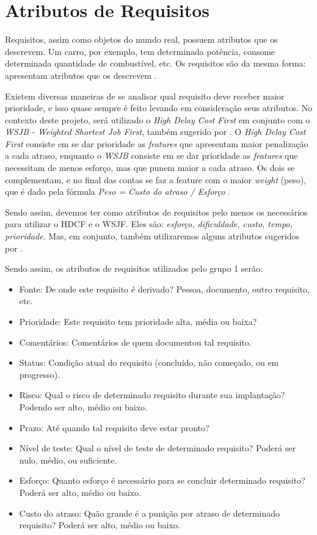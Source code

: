 \section{Atributos de Requisitos}
Requisitos, assim como objetos do mundo real, possuem atributos que os descrevem. Um carro, por exemplo, tem determinada potência, consome determinada quantidade de combustível, etc. Os requisitos são da mesma forma: apresentam atributos que os descrevem \cite{tel006}.

Existem diversas maneiras de se analisar qual requisito deve receber maior prioridade, e isso quase sempre é feito levando em consideração seus atributos. No contexto deste projeto, será utilizado o \emph{High Delay Cost First} em conjunto com o \emph{WSJB - Weighted Shortest Job First}, também sugerido por \cite{safe001}. O \emph{High Delay Cost First} consiste em se dar prioridade as \emph{features} que apresentam maior penalização a cada atraso, enquanto o \emph{WSJB} consiste em se dar prioridade as \emph{features} que necessitam de menos esforço, mas que punem maior a cada atraso. Os dois se complementam, e no final das contas se faz a feature com o maior \emph{weight} (peso), que é dado pela fórmula \emph{Peso = Custo do atraso / Esforço} \cite[p. 266]{safe001}.

Sendo assim, devemos ter como atributos de requisitos pelo menos os necessários para utilizar o HDCF e o WSJF. Eles são: \emph{esforço, dificuldade, custo, tempo, prioridade}. Mas, em conjunto, também utilizaremos alguns atributos sugeridos por \cite{tel006}.

Sendo assim, os atributos de requisitos utilizados pelo grupo 1 serão:
\begin{itemize}
  \item Fonte: De onde este requisito é derivado? Pessoa, documento, outro requisito, etc.
  \item Prioridade: Este requisito tem prioridade alta, média ou baixa?
  \item Comentários: Comentários de quem documentou tal requisito.
  \item Status: Condição atual do requisito (concluído, não começado, ou em progresso).
  \item Risco: Qual o risco de determinado requisito durante sua implantação? Podendo ser alto, médio ou baixo.
  \item Prazo: Até quando tal requisito deve estar pronto?
  \item Nível de teste: Qual o nível de teste de determinado requisito? Poderá ser nulo, médio, ou suficiente.
  \item Esforço: Quanto esforço é necessário para se concluir determinado requisito? Poderá ser alto, médio ou baixo.
  \item Custo do atraso: Quão grande é a punição por atraso de determinado requisito? Poderá ser alto, médio ou baixo.
\end{itemize}

